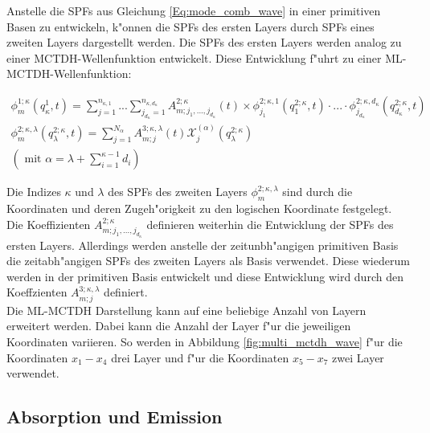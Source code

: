 Anstelle die SPFs aus Gleichung \ref{Eq:mode_comb_wave} in einer primitiven Basen zu entwickeln, k"onnen die SPFs des ersten Layers
durch SPFs eines zweiten Layers dargestellt werden. Die SPFs des ersten Layers werden analog zu einer MCTDH-Wellenfunktion entwickelt.
Diese Entwicklung f"uhrt zu einer ML-MCTDH-Wellenfunktion:

\begin{equation}
  \begin{gathered}
 \phi^{1;\kappa}_{m} (q^1_{\kappa}, t)=\sum^{n_{\kappa,1}}_{j=1} ... \sum^{n_{\kappa,d_\kappa}}_{j_{d_\kappa}=1} A^{2;\kappa}_{m;j_1,...,j_{d_\kappa}}(t)
 \times \phi^{2;\kappa,1}_{j_1} (q^{2;\kappa}_{1}, t) \cdot ... \cdot
 \phi^{2;\kappa,d_\kappa}_{j_{d_\kappa}} (q^{2;\kappa}_{d_\kappa}, t)
\\
 \phi^{2;\kappa, \lambda}_{m} (q^{2;\kappa}_{\lambda}, t)= \sum^{N_{\alpha}}_{j=1} A^{3;\kappa, \lambda}_{m;j}(t)
 \mathcal{X}^{(\alpha)}_{j}(q^{2;\kappa}_\lambda)
\\
 \left( \text{ mit } \alpha = \lambda + \sum^{\kappa - 1}_{i=1}d_i \right)
 \label{Eq:ml_mctdh_mode_SPF}
\end{gathered}
 \end{equation}

Die Indizes $\kappa$ und $\lambda$ des SPFs des zweiten Layers $ \phi^{2;\kappa, \lambda}_{m}  $  sind durch die Koordinaten und deren
Zugeh"origkeit zu den logischen Koordinate festgelegt.
Die Koeffizienten $A^{2;\kappa}_{m;j_1,...,j_{d_\kappa}}$ definieren weiterhin die Entwicklung der SPFs des ersten Layers.
Allerdings werden anstelle der zeitunbh"angigen primitiven Basis die zeitabh"angigen SPFs des zweiten Layers als Basis verwendet.
Diese wiederum werden in der primitiven Basis entwickelt und diese Entwicklung wird durch den Koeffzienten  $A^{3;\kappa, \lambda}_{m;j}$
definiert.
  \\Die ML-MCTDH Darstellung kann auf eine beliebige Anzahl von Layern erweitert werden.
  Dabei kann die Anzahl der Layer f"ur die jeweiligen Koordinaten variieren. So werden in Abbildung \ref{fig:multi_mctdh_wave} f"ur die Koordinaten $x_1-x_4$ drei Layer 
  und f"ur die Koordinaten $x_5 - x_7$ zwei Layer verwendet.









\clearpage
 \subsection{Absorption und Emission}
